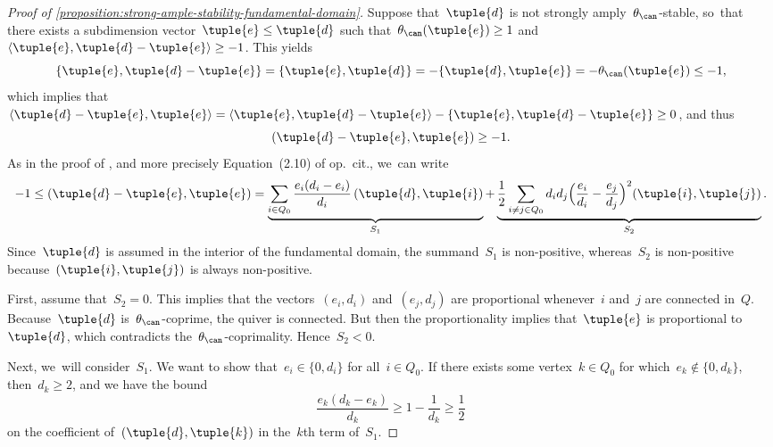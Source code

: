 \begin{proof}[Proof of \cref{proposition:strong-ample-stability-fundamental-domain}]
Suppose that~$\tuple{d}$ is not strongly amply~$\theta_\can$-stable, so~that
there exists a subdimension vector~$\tuple{e}\leq\tuple{d}$
such that~$\theta_\can(\tuple{e})\geq 1$
and~$\langle\tuple{e},\tuple{d}-\tuple{e}\rangle\geq-1$.
This yields
\begin{equation*}
\{\tuple{e},\tuple{d}-\tuple{e}\}
=\{\tuple{e},\tuple{d}\}
=-\{\tuple{d},\tuple{e}\}
=-\theta_\can(\tuple{e})\leq-1,
\end{equation*}
which implies that
$\langle\tuple{d}-\tuple{e},\tuple{e}\rangle
=\langle\tuple{e},\tuple{d}-\tuple{e}\rangle-\{\tuple{e},\tuple{d}-\tuple{e}\}
\geq0$,
and thus
\begin{equation*}
(\tuple{d}-\tuple{e},\tuple{e})\geq-1.
\end{equation*}
As in the proof of \cite[Lem.\,2.15]{MR0557581},
and more precisely Equation~(2.10) of op.~cit., we~can write
\begin{equation}
\label{equation:kac-inequality}
-1
\leq({\tuple{d}}-{\tuple{e}},{\tuple{e}})
=\underbrace{\sum_{i\in Q_0}\frac{e_i(d_i-e_i)}{d_i}\,({\tuple{d}},{\tuple{i}})}_{S_1}
+\underbrace{\frac{1}{2}\sum_{i\neq j\in Q_0}d_id_j\Bigl( \frac{e_i}{d_i}-\frac{e_j}{d_j} \Bigr)^2({\tuple{i}},{\tuple{j}})}_{S_2}.
\end{equation}
Since~$\tuple{d}$ is assumed in the interior of the fundamental domain,
the summand~$S_1$ is non-positive,
whereas~$S_2$ is non-positive because~$(\tuple{i},\tuple{j})$ is always non-positive.

First, assume that~$S_2=0$.
This implies that the vectors~$(e_i,d_i)$ and~$(e_j,d_j)$ are proportional
whenever~$i$ and~$j$ are connected in~$Q$.
Because~$\tuple{d}$ is~$\theta_\can$-coprime, the quiver is connected.
But then the proportionality implies that~$\tuple{e}$ is proportional to~$\tuple{d}$,
which contradicts the~$\theta_\can$-coprimality.
Hence~$S_2<0$.

Next, we~will consider~$S_1$.
We want to show that~$e_i \in \{0,d_i\}$ for all~$i\in Q_0$.
If there exists some vertex~$k\in Q_0$
for which~$e_k\not\in\{0,d_k\}$,
then~$d_k\geq 2$,
and we have the bound
\begin{equation}
\label{equation:two-inequalities}
\frac{e_k(d_k-e_k)}{d_k}\geq 1-\frac{1}{d_k}\geq\frac{1}{2}
\end{equation}
on the coefficient of~$(\tuple{d},\tuple{k})$ in the~$k$th term of~$S_1$.


\end{proof}
